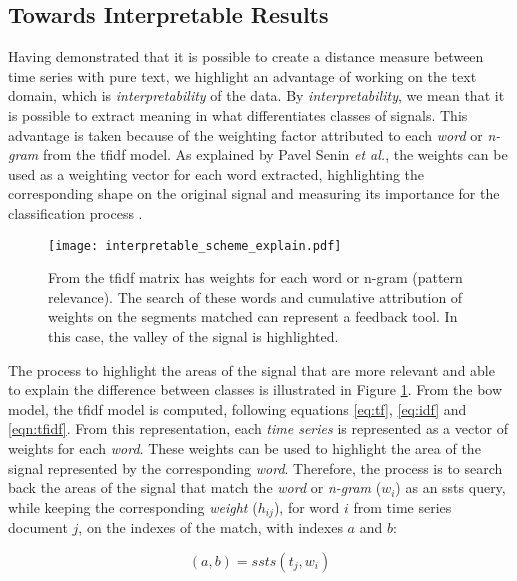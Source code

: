 \subsection{Towards Interpretable Results}

Having demonstrated that it is possible to create a distance measure between time series with pure text, we highlight an advantage of working on the text domain, which is \textit{interpretability} of the data. By \textit{interpretability}, we mean that it is possible to extract meaning in what differentiates classes of signals. This advantage is taken because of the weighting factor attributed to each \textit{word} or \textit{n-gram} from the \gls{tfidf} model. As explained by Pavel Senin \textit{et al.}, the weights can be used as a weighting vector for each word extracted, highlighting the corresponding shape on the original signal and measuring its importance for the classification process \cite{sax_vsm}.

\begin{figure}
    \centering
    \texttt{[image: interpretable\_scheme\_explain.pdf]}
    \caption{From the \gls{tfidf} matrix has weights for each word or n-gram (pattern relevance). The search of these words and cumulative attribution of weights on the segments matched can represent a feedback tool. In this case, the valley of the signal is highlighted.}
    \label{fig:interpretable_step}
\end{figure}


The process to highlight the areas of the signal that are more relevant and able to explain the difference between classes is illustrated in Figure \ref{fig:interpretable_step}. From the \gls{bow} model, the \gls{tfidf} model is computed, following equations \ref{eq:tf}, \ref{eq:idf} and \ref{eqn:tfidf}. From this representation, each \textit{time series} is represented as a vector of weights for each \textit{word}. These weights can be used to highlight the area of the signal represented by the corresponding \textit{word}. Therefore, the process is to search back the areas of the signal that match the \textit{word} or \textit{n-gram} ($w_i$) as an \gls{ssts} query, while keeping the corresponding \textit{weight} ($h_{ij}$), for word $i$ from time series document $j$, on the indexes of the match, with indexes $a$ and $b$:

\begin{equation}
(a,b) = ssts(t_j, w_i)
\end{equation}

